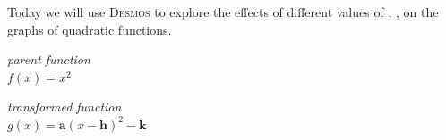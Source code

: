 \vspace{\parskip}
Today we will use {\scshape Desmos} 
to explore the effects of different values of 
, ,  
on the graphs of quadratic functions. 

\begin{tcbraster}[
    raster columns = 2,
    raster equal height,
    raster left skip = 0.5in, raster right skip = 0.5in, raster column skip = 0.75in,
    raster before skip = 0.25in, raster after skip = 0.25in,
]
    \begin{tcolorbox}[]
        \centering
        {\itshape parent function}\\[1\baselineskip]
        \Large
        $ f(x) = x^2 $
    \end{tcolorbox}
    \begin{tcolorbox}[]
        \centering
        {\itshape transformed function}\\[1\baselineskip]
        \Large
        $g(x) = \bm{a}(x-\bm{h})^2 - \bm{k}$
    \end{tcolorbox}
\end{tcbraster}

\vfill 


